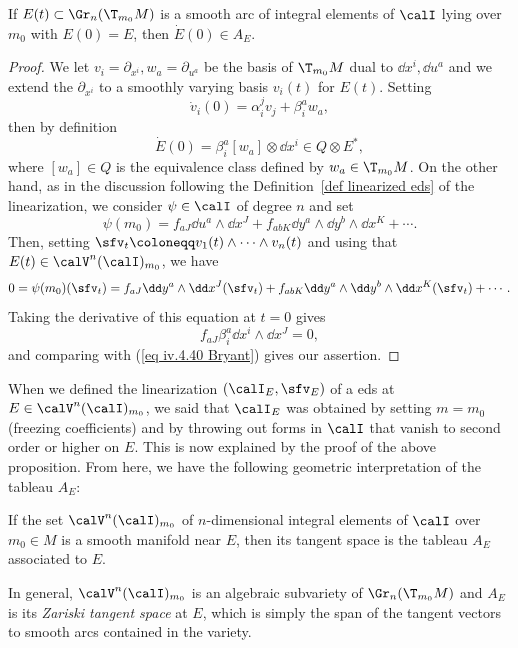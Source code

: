 \begin{prop}\label{prop (iv.3.41) Bryant}
    If $E(t)\subset \Gr_n(\T_{m_0} M)$ is a smooth arc of integral elements of $\calI$ lying over $m_0$ with $E(0)=E$, then $\dot E(0)\in A_E$.
\end{prop}
\begin{proof}
    We let $v_i=\partial_{x^i},w_a=\partial_{u^a}$ be the basis of $\T_{m_0}M$ dual to $\dd x^i,\dd u^a$ and we extend the $\partial_{x^i}$ to a smoothly varying basis $v_i(t)$ for $E(t)$. Setting 
    \[\dot v_i(0)=\alpha^j_iv_j+\beta^a_iw_a,\]
    then by definition 
    \[\dot E(0)=\beta^a_i[w_a]\otimes \dd x^i\in Q\otimes E^\ast,\]
    where $[w_a]\in Q$ is the equivalence class defined by $w_a\in\T_{m_0}M$. On the other hand, as in the discussion following the Definition~\ref{def linearized eds} of the linearization, we consider $\psi\in \calI$ of degree $n$ and set 
    \[\psi(m_0)=f_{aJ}\dd u^a\wedge\dd x^J+f_{abK}\dd y^a\wedge\dd y^b\wedge\dd x^K+\cdots.\]
    Then, setting $\sfv_t\coloneqq v_1(t)\wedge\cdots\wedge v_n(t)$ and using that $E(t)\in\calV^n(\calI)_{m_0}$, we have 
    \[
        0=\psi(m_0)(\sfv_t)=f_{aJ}\dd y^a\wedge\dd x^J(\sfv_t)+f_{abK}\dd y^a\wedge\dd y^b\wedge\dd x^K(\sfv_t)+\cdots.
    \]
    Taking the derivative of this equation at $t=0$ gives 
    \[f_{aJ}\beta^a_i\dd x^i\wedge\dd x^J=0,\]
    and comparing with (\ref{eq iv.4.40 Bryant}) gives our assertion.
\end{proof}

When we defined the linearization $(\calI_E,\sfv_E)$ of a \gls{eds} at $E\in\calV^n(\calI)_{m_0}$, we said that $\calI_E$ was obtained by setting $m=m_0$ (freezing coefficients) and by throwing out forms in $\calI$ that vanish to second order or higher on $E$. This is now explained by the proof of the above proposition. From here, we have the following geometric interpretation of the tableau $A_E$:

\begin{cor}\label{prop iv.4.2 Bryant}
    If the set $\calV^n(\calI)_{m_0}$ of $n$-dimensional integral elements of $\calI$ over $m_0\in M$ is a smooth manifold near $E$, then its tangent space is the tableau $A_E$ associated to $E$.
\end{cor}

In general, $\calV^n(\calI)_{m_0}$ is an algebraic subvariety of $\Gr_n(\T_{m_0}M)$ and $A_E$ is its \emph{Zariski tangent space} at $E$, which is simply the span of the tangent vectors to smooth arcs contained in the variety.


